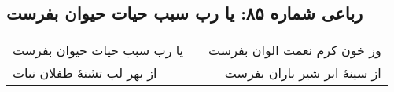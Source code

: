 \begin{center}
\section*{رباعی شماره ۸۵: یا رب سبب حیات حیوان بفرست}
\label{sec:sh085}
\begin{longtable}{l p{0.5cm} r}
یا رب سبب حیات حیوان بفرست
&&
وز خون کرم نعمت الوان بفرست
\\
از بهر لب تشنهٔ طفلان نبات
&&
از سینهٔ ابر شیر باران بفرست
\\
\end{longtable}
\end{center}
